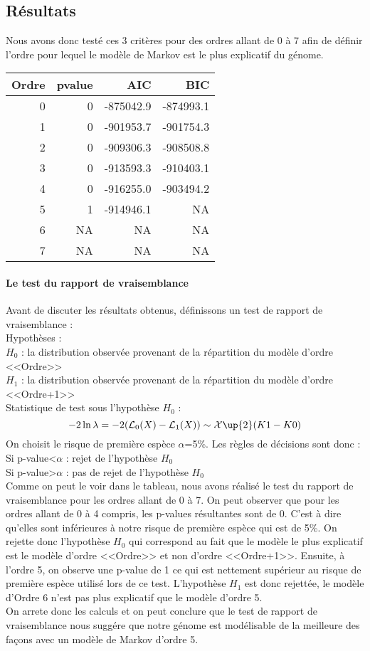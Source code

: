 \documentclass[12pt,a4paper]{article}
\begin{document}
\subsection{Résultats}
Nous avons donc testé ces 3 critères pour des ordres allant de 0 à 7 afin de définir l'ordre pour lequel le modèle de Markov est le plus explicatif du génome.
\begin{table}[!h]
\centering
\begin{tabular}{r|r|r|r}
\hline
Ordre & pvalue & AIC & BIC\\
\hline
0 & 0 & -875042.9 & -874993.1\\
1 & 0 & -901953.7 & -901754.3\\
2 & 0 & -909306.3 & -908508.8\\
3 & 0 & -913593.3 & -910403.1\\
4 & 0 & -916255.0 & -903494.2\\
5 & 1 & -914946.1 & NA\\
6 & NA & NA & NA\\
7 & NA & NA & NA\\
\hline
\end{tabular}
\end{table}
\paragraph{Le test du rapport de vraisemblance}
Avant de discuter les résultats obtenus, définissons un test de rapport de vraisemblance : \\
Hypothèses :\\
$H_0$ : la distribution observée provenant de la répartition du modèle d'ordre <<Ordre>> \\
$H_1$ : la distribution observée provenant de la répartition du modèle d'ordre <<Ordre+1>> \\
Statistique de test sous l'hypothèse $H_0$ : 
\[
-2\ln\lambda = -2(\mathcal{L}_0(X)-\mathcal{L}_1(X)) \sim  \mathcal{X}\up{2}(K1-K0)
\]
On choisit le risque de première espèce $\alpha$=5\%. Les règles de décisions sont donc :\\
Si p-value<$\alpha$ : rejet de l'hypothèse $H_0$ \\
Si p-value>$\alpha$ : pas de rejet de l'hypothèse $H_0$ \\

Comme on peut le voir dans le tableau, nous avons réalisé le test du rapport de vraisemblance pour les ordres allant de 0 à 7.
On peut observer que pour les ordres allant de 0 à 4 compris, les p-values résultantes sont de 0. C'est à dire qu'elles sont inférieures à notre risque de première espèce qui est de 5\%. On rejette donc l'hypothèse $H_0$ qui correspond au fait que le modèle le plus explicatif est le modèle d'ordre <<Ordre>> et non d'ordre <<Ordre+1>>. Ensuite, à l'ordre 5, on observe une p-value de 1 ce qui est nettement supérieur au risque de première espèce utilisé lors de ce test. L'hypothèse $H_1$ est donc rejettée, le modèle d'Ordre 6 n'est pas plus explicatif que le modèle d'ordre 5.
\\ \indent
On arrete donc les calculs et on peut conclure que le test de rapport de vraisemblance nous suggére que notre génome est modélisable de la meilleure des façons avec un modèle de Markov d'ordre 5.
\end{document}
